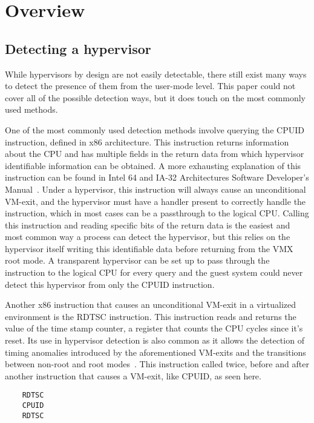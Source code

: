 \section{Overview}\label{s:overview}

\subsection{Detecting a hypervisor}

While hypervisors by design are not easily detectable, there still exist many ways to detect the presence of them from the user-mode level. 
This paper could not cover all of the possible detection ways, but it does touch on the most commonly used methods.

One of the most commonly used detection methods involve querying the CPUID instruction, defined in x86 architecture. 
This instruction returns information about the CPU and has multiple fields in the return data from which hypervisor identifiable information can be obtained. 
A more exhausting explanation of this instruction can be found in Intel\textsuperscript{\tiny\textregistered} 64 and IA-32 Architectures Software Developer's Manual~\cite[Volume~2A]{Intel-SDM2025}. Under a hypervisor, 
this instruction will always cause an unconditional VM-exit, and the hypervisor must have a handler present to correctly handle the instruction, 
which in most cases can be a passthrough to the logical CPU. Calling this instruction and reading specific bits of the return data is the easiest 
and most common way a process can detect the hypervisor, but this relies on the hypervisor itself writing this identifiable data before returning from the VMX root mode. 
A transparent hypervisor can be set up to pass through the instruction to the logical CPU for every query and the guest system could never detect this hypervisor from only the CPUID instruction.

Another x86 instruction that causes an unconditional VM-exit in a virtualized environment is the RDTSC instruction. This instruction reads and returns the value of the time stamp counter, 
a register that counts the CPU cycles since it's reset. Its use in hypervisor detection is also common as it allows the detection of timing anomalies introduced by the aforementioned VM-exits 
and the transitions between non-root and root modes~\cite{hyperdbg-transparency}. This instruction called twice, before and after another instruction that causes a VM-exit, like CPUID, as seen here.
\begin{verbatim}
    RDTSC
    CPUID
    RDTSC
\end{verbatim}


